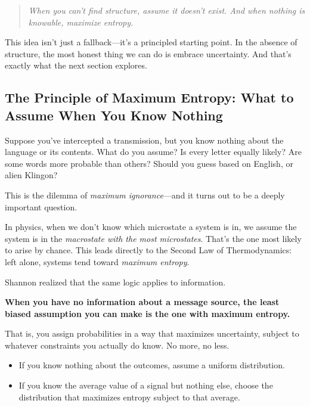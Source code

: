 \begin{quote}
\textit{When you can’t find structure, assume it doesn’t exist. And when nothing is knowable, maximize entropy.}
\end{quote}

This idea isn’t just a fallback—it’s a principled starting point. In the absence of structure, the most honest thing we can do is embrace uncertainty. And that’s exactly what the next section explores.










\subsection{The Principle of Maximum Entropy: What to Assume When You Know Nothing}

Suppose you’ve intercepted a transmission, but you know nothing about the language or its contents. What do you assume? Is every letter equally likely? Are some words more probable than others? Should you guess based on English, or alien Klingon?

This is the dilemma of \emph{maximum ignorance}—and it turns out to be a deeply important question.

In physics, when we don’t know which microstate a system is in, we assume the system is in the \emph{macrostate with the most microstates}. That’s the one most likely to arise by chance. This leads directly to the Second Law of Thermodynamics: left alone, systems tend toward \emph{maximum entropy}.

Shannon realized that the same logic applies to information.

\textbf{When you have no information about a message source, the least biased assumption you can make is the one with maximum entropy.}

That is, you assign probabilities in a way that maximizes uncertainty, subject to whatever constraints you actually do know. No more, no less.

\begin{itemize}
  \item If you know nothing about the outcomes, assume a uniform distribution.
  \item If you know the average value of a signal but nothing else, choose the distribution that maximizes entropy subject to that average.
\end{itemize}

